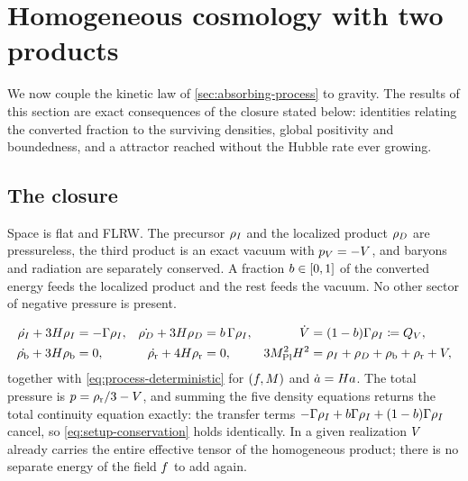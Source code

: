 \section{Homogeneous cosmology with two products}
\label{sec:homogeneous-cosmology}

We now couple the kinetic law of \cref{sec:absorbing-process} to gravity. The
results of this section are exact consequences of the closure stated below:
identities relating the converted fraction to the surviving densities, global
positivity and boundedness, and a \dS attractor reached without the Hubble rate
ever growing.

\subsection{The closure}\label{sec:cosmology-closure}

\begin{assumption}\label{asm:closure}
  Space is flat and FLRW. The precursor $\rho_{I}$ and the localized
  product $\rho_{D}$ are pressureless, the third product is an exact vacuum with
  $p_V=-V$, and baryons and radiation are separately conserved. A fraction
  $b\in[0,1]$ of the converted energy feeds the localized product and the
  rest feeds the vacuum. No other sector of negative pressure is present.
\end{assumption}

\begin{equation}\label{eq:cosmology-system}
  \begin{aligned}
    \dot{\rho_{I}}+3H\rho_{I}&=-\Gamma\rho_{I}, &
    \dot{\rho_{D}}+3H\rho_{D}&=b\,\Gamma\rho_{I}, &
    \dot {V}&=(1-b)\Gamma\rho_{I}\coloneqq Q_{V},\\
    \dot{\rho_{\mathrm{b}}}+3H\rho_{\mathrm{b}}&=0, &
    \dot{\rho_{\mathrm{r}}}+4H\rho_{\mathrm{r}}&=0, &
    3M_{\mathrm{Pl}}^2H^2&=\rho_{I}+\rho_{D}+\rho_{\mathrm{b}}+\rho_{\mathrm{r}}+V,
  \end{aligned}
\end{equation}
%
together with \cref{eq:process-deterministic} for $(f,M)$ and $\dot
a=H a$. The total pressure is $p=\rho_{\mathrm{r}}/3-V$, and summing the five
density equations returns the total continuity equation exactly: the transfer
terms $-\Gamma\rho_{I}+b\Gamma\rho_{I}+(1-b)\Gamma\rho_{I}$ cancel, so
\cref{eq:setup-conservation} holds identically. In a given realization $V$
already carries the entire effective tensor of the homogeneous product; there
is no separate energy of the field $f$ to add again.

